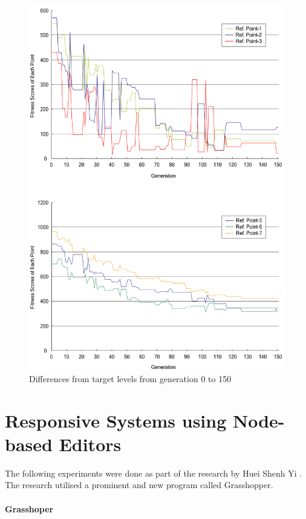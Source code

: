 \begin{figure}[h]
\centering
\includegraphics[width=\textwidth]{./Images/30-RFDSdiff}
\caption[RFDS Target Level Differences]{Differences from target levels from generation 0 to 150 \cite{kawakita01}}
\label{fig:RFDSdiff}
\end{figure}


\clearpage
\section{Responsive Systems using Node-based Editors}

The following experiments were done as part of the research by Huei Shenh Yi \cite{yi09}. The research utilised a prominent and new program called Grasshopper.

\paragraph{Grasshoper}\mbox{}

